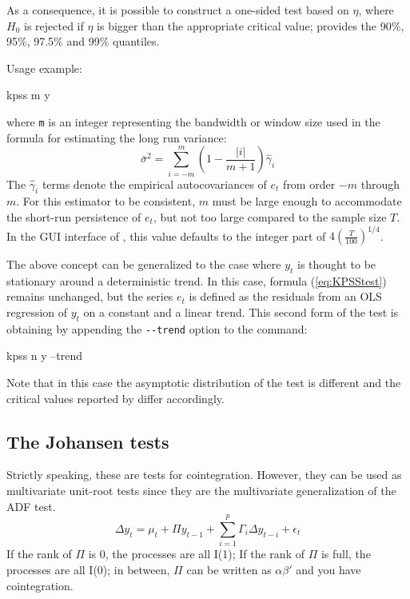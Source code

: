 As a consequence, it is possible to construct a one-sided test based
on $\eta$, where $H_0$ is rejected if $\eta$ is bigger than the
appropriate critical value;  provides the 90\%, 95\%,
97.5\% and 99\% quantiles.

Usage example:
\begin{code}
  kpss m y
\end{code}
where \verb|m| is an integer representing the bandwidth or window
size used in the formula for estimating the long run variance:
\[
  \bar{\sigma}^2 = \sum_{i=-m}^m \left( 1 - \frac{|i|}{m+1} \right) \hat{\gamma}_i
\]
The $\hat{\gamma}_i$ terms denote the empirical autocovariances of
$e_t$ from order $-m$ through $m$.  For this estimator to be
consistent, $m$ must be large enough to accommodate the short-run
persistence of $e_t$, but not too large compared to the sample size
$T$.  In the GUI interface of , this value defaults to the
integer part of $4 \left( \frac{T}{100} \right)^{1/4}$.

The above concept can be generalized to the case where $y_t$ is
thought to be stationary around a deterministic trend. In this case,
formula (\ref{eq:KPSStest}) remains unchanged, but the series $e_t$ is
defined as the residuals from an OLS regression of $y_t$ on a constant
and a linear trend. This second form of the test is obtaining by
appending the \verb|--trend| option to the  command:
\begin{code}
  kpss n y --trend
\end{code}
Note that in this case the asymptotic distribution of the test is
different and the critical values reported by  differ
accordingly.


\subsection{The Johansen tests}
\label{sec:Joh-test}

Strictly speaking, these are tests for cointegration. However, they
can be used as multivariate unit-root tests since they are the
multivariate generalization of the ADF test.
\begin{equation}
  \label{eq:Joh-tests}
  \Delta y_t = \mu_t + \Pi y_{t-1} + \sum_{i=1}^p \Gamma_i \Delta
  y_{t-i} + \epsilon_t
\end{equation}
If the rank of $\Pi$ is 0, the processes are all I(1); If the rank of
$\Pi$ is full, the processes are all I(0); in between, $\Pi$ can be
written as $\alpha \beta'$ and you have cointegration.


